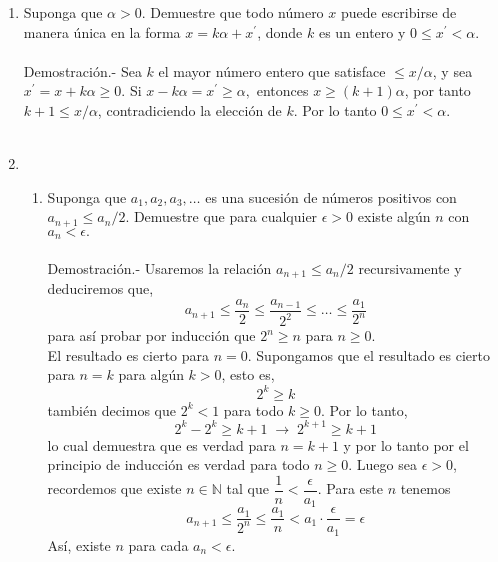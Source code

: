 \begin{enumerate}[\bfseries 1.]
\begin{enumerate}[\bfseries (a)]
	\end{enumerate}

    \item Suponga que $\alpha>0$. Demuestre que todo número $x$ puede escribirse de manera única en la forma $x=k\alpha + x^{'}$, donde $k$ es un entero y $0\leq x^{'}<\alpha$.\\\\
	Demostración.-\; Sea $k$ el mayor número entero que satisface $\leq x/\alpha$, y sea $x^{'}=x+k\alpha \geq 0$. Si $x-k\alpha=x^{'}\geq \alpha,$ entonces $x\geq (k+1)\alpha$, por tanto $k+1\leq x/\alpha$, contradiciendo la elección de $k$. Por lo tanto $0\leq x^{'}<\alpha$.\\\\

    \item 
	\begin{enumerate}[\bfseries (a)]

	    \item Suponga que $a_1,a_2,a_3,\ldots$ es una sucesión de números positivos con $a_{n+1}\leq a_n/2$. Demuestre que para cualquier $\epsilon>0$ existe algún $n$ con $a_n<\epsilon.$\\\\
		Demostración.-\; Usaremos la relación $a_{n+1}\leq a_n/2$ recursivamente y deduciremos que,
		$$a_{n+1}\leq \dfrac{a_n}{2}\leq \dfrac{a_{n-1}}{2^2}\leq \ldots \leq \dfrac{a_1}{2^n}$$
		para así probar por inducción que $2^n\geq n$ para $n\geq 0$.\\
		El resultado es cierto para $n=0$. Supongamos que el resultado es cierto para $n=k$ para algún $k>0$, esto es,
		$$2^k\geq k$$
		también decimos que $2^k<1$ para todo $k\geq 0$. Por lo tanto,
		$$2^k-2^k\geq k+1 \; \longrightarrow \; 2^{k+1}\geq k+1$$
		lo cual demuestra que es verdad para $n=k+1$ y por lo tanto por el principio de inducción es verdad para todo $n\geq 0$. Luego sea $\epsilon>0$, recordemos que existe $n\in \mathbb{N}$ tal que $\dfrac{1}{n}<\dfrac{\epsilon}{a_1}$. Para este $n$ tenemos 
		$$a_{n+1}\leq \dfrac{a_1}{2^n}\leq \dfrac{a_1}{n} < a_1\cdot \dfrac{\epsilon}{a_1}=\epsilon$$
		Así, existe $n$ para cada $a_n<\epsilon.$\\\\


\end{enumerate}
\end{enumerate}
